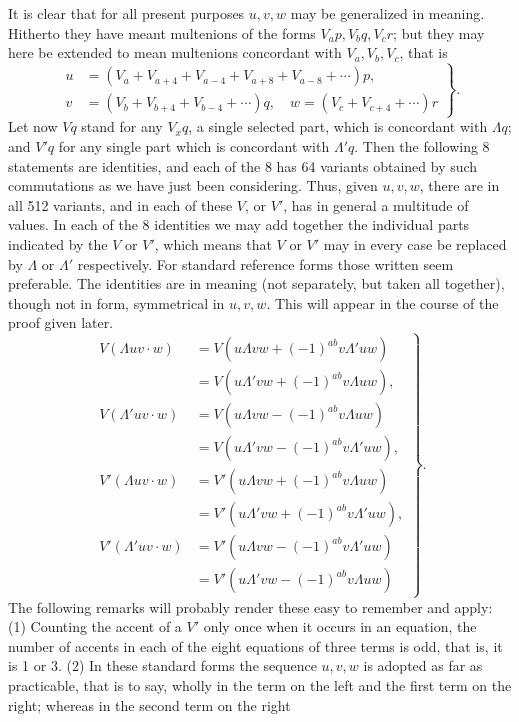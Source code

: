 \documentclass[11pt]{article}
\begin{document}
It is clear that for all present purposes $u,v,w$ may be generalized in meaning. Hitherto they have meant multenions of the forms $V_ap,V_bq,V_cr$; but they may here be extended to mean multenions concordant with $V_a,V_b,V_c$, that is
\begin{equation}\left.\begin{aligned}u&=(V_a+V_{a+4}+V_{a-4}+V_{a+8}+V_{a-8}+\cdots)p,\\v&=(V_b+V_{b+4}+V_{b-4}+\cdots)q,\quad w=(V_c+V_{c+4}+\cdots)r\end{aligned}\right\}.\tag{4}\end{equation}
Let now $Vq$ stand for any $V_xq$, a single selected part, which is concordant with $\Lambda q$; and $V'q$ for any single part which is concordant with $\Lambda'q$. Then the following 8 statements are identities, and each of the 8 has 64 variants obtained by such commutations as we have just been considering. Thus, given $u,v,w$, there are in all 512 variants, and in each of these $V$, or $V'$, has in general a multitude of values. In each of the 8 identities we may add together the individual parts indicated by the $V$ or $V'$, which means that $V$ or $V'$ may in every case be replaced by $\Lambda$ or $\Lambda'$ respectively. For standard reference forms those written seem preferable. The identities are in meaning (not separately, but taken all together), though not in form, symmetrical in $u,v,w$. This will appear in the course of the proof given later.
\begin{equation}
\left.\begin{aligned}
V(\Lambda uv\cdot w)&=V(u\Lambda vw+(-1)^{ab}v\Lambda'uw)\\
 &=V(u\Lambda'vw+(-1)^{ab}v\Lambda uw),\\[3pt]
V(\Lambda'uv\cdot w)&=V(u\Lambda vw-(-1)^{ab}v\Lambda uw)\\
 &=V(u\Lambda'vw-(-1)^{ab}v\Lambda'uw),\\[3pt]
V'(\Lambda uv\cdot w)&=V'(u\Lambda vw+(-1)^{ab}v\Lambda uw)\\
 &=V'(u\Lambda'vw+(-1)^{ab}v\Lambda'uw),\\[3pt]
V'(\Lambda'uv\cdot w)&=V'(u\Lambda vw-(-1)^{ab}v\Lambda'uw)\\
 &=V'(u\Lambda'vw-(-1)^{ab}v\Lambda uw)
\end{aligned}\right\}.\tag{5}
\end{equation}
The following remarks will probably render these easy to remember and apply: (1) Counting the accent of a $V'$ only once when it occurs in an equation, the number of accents in each of the eight equations of three terms is odd, that is, it is 1 or 3. (2) In these standard forms the sequence $u,v,w$ is adopted as far as practicable, that is to say, wholly in the term on the left and the first term on the right; whereas in the second term on the right
\end{document}
